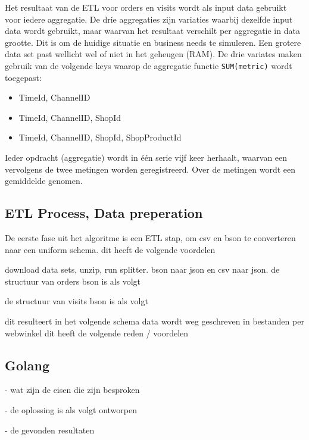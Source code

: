 Het resultaat van de ETL voor orders en visits wordt als input data gebruikt voor iedere aggregatie. De drie aggregaties zijn variaties waarbij dezelfde input data wordt gebruikt, maar waarvan het resultaat verschilt per aggregatie in data grootte. Dit is om de huidige situatie en business needs te simuleren. Een grotere data set past wellicht wel of niet in het geheugen (RAM). De drie variates maken gebruik van de volgende keys waarop de aggregatie functie \verb#SUM(metric)# wordt toegepast:

\begin{itemize}
    \item TimeId, ChannelID
    \item TimeId, ChannelID, ShopId
    \item TimeId, ChannelID, ShopId, ShopProductId
\end{itemize}

Ieder opdracht (aggregatie) wordt in één serie vijf keer herhaalt, waarvan een vervolgens de twee metingen worden geregistreerd. Over de metingen wordt een gemiddelde genomen.

\subsection{ETL Process, Data preperation}

De eerste fase uit het algoritme is een ETL stap, om csv en bson te converteren naar een uniform schema.
dit heeft de volgende voordelen


download data sets, unzip, run splitter. bson naar json en csv naar json.
de structuur van orders bson is als volgt

de structuur van visits bson is als volgt

dit resulteert in het volgende schema
data wordt weg geschreven in bestanden per webwinkel
dit heeft de volgende reden / voordelen


\subsection{Golang}

- wat zijn de eisen die zijn besproken

- de oplossing is als volgt ontworpen

- de gevonden resultaten

